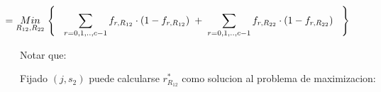 \documentclass[
  11pt,
  a4paper,
]{article}
\begin{document}
\begin{gather*}
\hspace{-1.5 cm} =   \underset{R_{12}  ,  R_{22} }  {Min} \hspace{0.1cm} \Biggl\{ \hspace{0.3cm}  \sum_{r=0,1,..,c-1}^{} f_{r , R_{12}}\cdot(1 - f_{r , R_{12}})  \hspace{0.1cm} + \hspace{0.1cm}  \sum_{r=0,1,..,c-1}^{} f_{r , R_{22}}\cdot(1 - f_{r , R_{22}})  \hspace{0.3cm} \Biggl\}  
\end{gather*}

Notar que:

Fijado \((j, s_2)\) puede calcularse \(r_{R_{12}}^*\) como solucion al
problema de maximizacion:

\begin{gather*}

\end{gather*}
\end{document}
